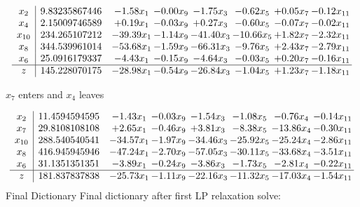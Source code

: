\documentclass[8pt]{article}
\begin{document}
 \[\begin{array}{c| c c@{\hskip 2pt} c@{\hskip 2pt} c@{\hskip 2pt} c@{\hskip 2pt} c@{\hskip 2pt} c@{\hskip 2pt} }
 x_{2}   &  9.83235867446 & -1.58 x_{1} & -0.00 x_{9} & -1.75 x_{3} & -0.62 x_{5} & +  0.05 x_{7} & -0.12 x_{11}\\
 x_{4}   &  2.15009746589 & +  0.19 x_{1} & -0.03 x_{9} & +  0.27 x_{3} & -0.60 x_{5} & -0.07 x_{7} & -0.02 x_{11}\\
 x_{10}   &  234.265107212 & -39.39 x_{1} & -1.14 x_{9} & -41.40 x_{3} & -10.66 x_{5} & +  1.82 x_{7} & -2.32 x_{11}\\
 x_{8}   &  344.539961014 & -53.68 x_{1} & -1.59 x_{9} & -66.31 x_{3} & -9.76 x_{5} & +  2.43 x_{7} & -2.79 x_{11}\\
 x_{6}   &  25.0916179337 & -4.43 x_{1} & -0.15 x_{9} & -4.64 x_{3} & -0.03 x_{5} & +  0.20 x_{7} & -0.16 x_{11}\\
\hline
z    &  145.228070175 & -28.98 x_{1} & -0.54 x_{9} & -26.84 x_{3} & -1.04 x_{5} & +  1.23 x_{7} & -1.18 x_{11}\\
\end{array}\]


 $ x_{7} $ enters and $ x_{4} $ leaves 

 \[\begin{array}{c| c c@{\hskip 2pt} c@{\hskip 2pt} c@{\hskip 2pt} c@{\hskip 2pt} c@{\hskip 2pt} c@{\hskip 2pt} }
 x_{2}   &  11.4594594595 & -1.43 x_{1} & -0.03 x_{9} & -1.54 x_{3} & -1.08 x_{5} & -0.76 x_{4} & -0.14 x_{11}\\
 x_{7}   &  29.8108108108 & +  2.65 x_{1} & -0.46 x_{9} & +  3.81 x_{3} & -8.38 x_{5} & -13.86 x_{4} & -0.30 x_{11}\\
 x_{10}   &  288.540540541 & -34.57 x_{1} & -1.97 x_{9} & -34.46 x_{3} & -25.92 x_{5} & -25.24 x_{4} & -2.86 x_{11}\\
 x_{8}   &  416.945945946 & -47.24 x_{1} & -2.70 x_{9} & -57.05 x_{3} & -30.11 x_{5} & -33.68 x_{4} & -3.51 x_{11}\\
 x_{6}   &  31.1351351351 & -3.89 x_{1} & -0.24 x_{9} & -3.86 x_{3} & -1.73 x_{5} & -2.81 x_{4} & -0.22 x_{11}\\
\hline
z    &  181.837837838 & -25.73 x_{1} & -1.11 x_{9} & -22.16 x_{3} & -11.32 x_{5} & -17.03 x_{4} & -1.54 x_{11}\\
\end{array}\]
Final Dictionary
Final dictionary after first LP relaxation solve: 
\end{document}
